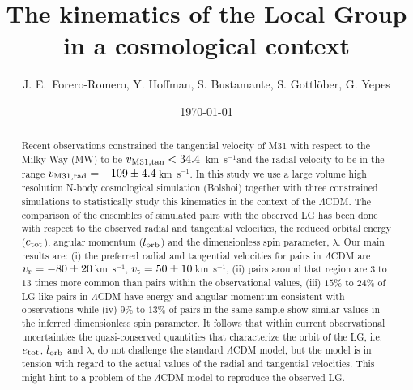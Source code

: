 \documentclass{emulateapj}
\newcommand{\kms}{\,km~s$^{-1}$}
\begin{document}
\title{The kinematics of the Local Group in a cosmological context}
\author{
J. E.\ Forero-Romero, 
Y. Hoffman, 
S. Bustamante, 
S. Gottl\"ober, 
G. Yepes
}


\date{\today}

\begin{abstract}
Recent observations constrained the tangential velocity of M31 with
respect to the Milky Way (MW) to be $v_{\rm M31,tan}<34.4$ \kms and
the radial velocity to be in the range $v_{\rm M31,rad}=-109\pm
4.4$\kms \citep{vanderMarel12}. In this study we use a large volume
high resolution N-body cosmological simulation (Bolshoi) together with three
constrained simulations to statistically study this kinematics in the
context of the $\Lambda$CDM. The comparison of the ensembles of
simulated pairs with the observed LG has been done with respect to the
observed radial and tangential velocities, the reduced orbital energy
($e_{\rm tot}$), angular momentum ($l_{\rm orb}$) and the
dimensionless spin parameter, $\lambda$. Our main results are: (i) the
preferred radial and tangential velocities for pairs in $\Lambda$CDM
are $v_{\rm r}=-80\pm 20$\kms, $v_{\rm   t}=50\pm 10$\kms, (ii) pairs
around that region are $3$ to $13$ times more common than pairs within
the observational values, (iii) $15\%$ to $24\%$ of LG-like pairs in
$\Lambda$CDM have energy and angular momentum consistent with
observations while (iv) $9\%$ to $13\%$ of pairs in the same sample
show similar values in the inferred dimensionless spin parameter. It
follows that within current observational uncertainties the
quasi-conserved quantities that characterize the orbit of
the LG, i.e. $e_{\rm tot}$, $l_{\rm   orb}$ and $\lambda$, do not
challenge the standard $\Lambda$CDM model, but the model is in tension
with regard to the actual values of the radial and tangential
velocities. This might hint to a problem of the $\Lambda$CDM model to
reproduce the observed LG.  

\end{abstract}
\end{document}
